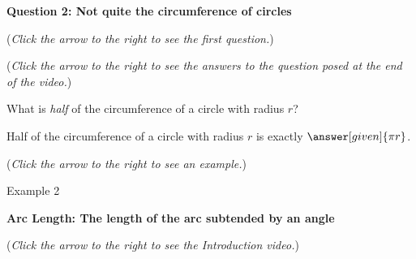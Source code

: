 \documentclass{ximera}
\begin{document}
\textbf{Question 2: Not quite the circumference of circles}
\begin{question}
\begin{flushright}
{\color{blue}(\emph{Click the arrow to the right to see the first question.})}
\end{flushright}
\begin{center}
\begin{expandable}
{\color{blue}(\emph{Click the arrow to the right to see the answers 
to the question posed at the end of the video.})}
\begin{expandable}
What is \emph{half} of the circumference of a circle with radius $r$?
\begin{prompt}
Half of the circumference of a circle with radius $r$ is exactly $\answer[given]{\pi r}$.
\end{prompt}
\begin{flushright}
{\color{blue}(\emph{Click the arrow to the right to see an example.})}
\end{flushright}
\begin{expandable}
Example 2
\end{expandable}
\end{expandable}
\end{expandable}
\end{center}
\end{question}


\textbf{Arc Length: The length of the arc subtended by an angle}
\begin{flushright}
{\color{blue}(\emph{Click the arrow to the right to see the Introduction video.})}
\end{flushright}
\begin{center}
\begin{expandable}
\end{expandable}
\end{center}
\end{document}
